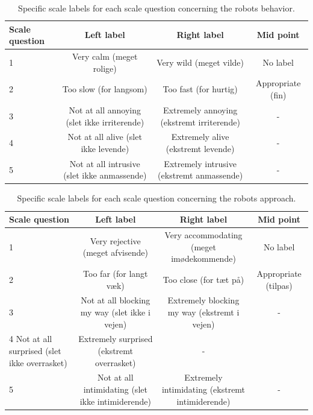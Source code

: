 %
\begin{table}[H]
	\centering
	\begin{tabular}{l|c|c|c}
		Scale question     & Left label & Right label & Mid point \\\hline
		1   & Very calm (meget rolige) & Very wild (meget vilde) & No label          \\\hline
		2   & Too slow (for langsom) & Too fast (for hurtig) & Appropriate (fin)         \\\hline
		3   & Not at all annoying (slet ikke irriterende) & Extremely annoying (ekstremt irriterende) & -         \\\hline
	 	4   & Not at all alive (slet ikke levende) & Extremely alive (ekstremt levende) & -         \\\hline
		5   & Not at all intrusive (slet ikke anmassende) & Extremely intrusive (ekstremt anmassende) & -            
	\end{tabular}
	\caption{Specific scale labels for each scale question concerning the robots behavior.}
	\label{tab:Latin}         
\end{table}
\noindent
%

%
\begin{table}[H]
	\centering
	\begin{tabular}{l|c|c|c}
		Scale question     & Left label & Right label & Mid point \\\hline
		1   & Very rejective (meget afvisende) & Very accommodating (meget imødekommende) & No label          \\\hline
		2   & Too far (for langt væk) & Too close (for tæt på) & Appropriate (tilpas)         \\\hline
		3   & Not at all blocking my way (slet ikke i vejen) & Extremely blocking my way (ekstremt i vejen) & -         \\\hline
	 	4   Not at all surprised (slet ikke overrasket) & Extremely surprised (ekstremt overrasket) & -         \\\hline
		5   & Not at all intimidating (slet ikke intimiderende) & Extremely intimidating (ekstremt intimiderende) & -           
	\end{tabular}
	\caption{Specific scale labels for each scale question concerning the robots approach.}
	\label{tab:Latin}         
\end{table}
\noindent
%

